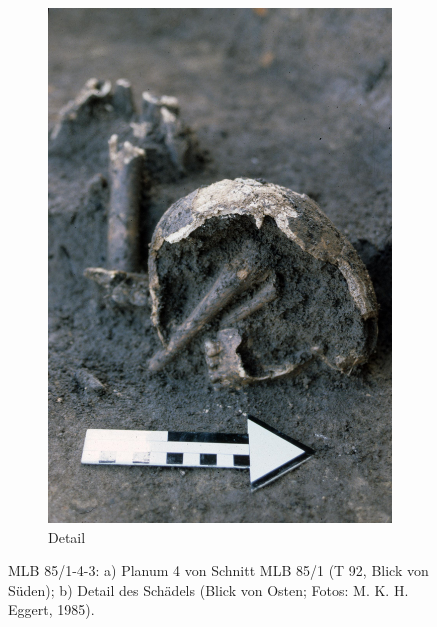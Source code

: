 \begin{figure}[tb]
\begin{subfigure}{\columnwidth}
 \includegraphics[width=\columnwidth]{fig/MLB85-143_E85-032-10.jpg}
 \caption{Detail}
 \label{fig:MLB85-143_Detail}
 \end{subfigure}
 \caption{MLB 85/1-4-3: a) Planum 4 von Schnitt MLB 85/1 (T 92, Blick von Süden); b) Detail des Schädels (Blick von Osten; Fotos: M. K. H. Eggert, 1985).}
 \label{fig:MLB85-1_SekBest_Fotos}
\end{figure}

